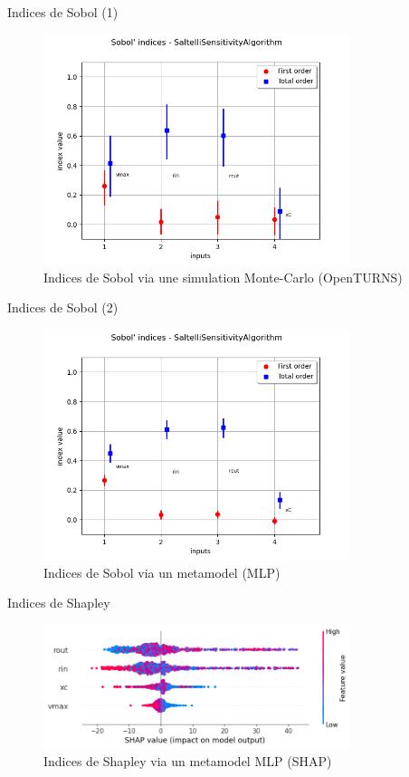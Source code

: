 \documentclass[10pt]{beamer}
\begin{document}
\begin{frame}{Indices de Sobol (1)}
  \begin{figure}
    \centering
    \includegraphics[width=0.8\textwidth]{images/sobol1.png}
    \caption{Indices de Sobol via une simulation Monte-Carlo (OpenTURNS\cite{baudinOpenTURNSIndustrialSoftware2016})}
  \end{figure}
\end{frame}

\begin{frame}{Indices de Sobol (2)}
  \begin{figure}
    \centering
    \includegraphics[width=0.8\textwidth]{images/sobol2.png}
    \caption{Indices de Sobol via un metamodel (MLP)}
  \end{figure}
\end{frame}

\begin{frame}{Indices de Shapley}
  \begin{figure}
    \centering
    \includegraphics[width=0.8\textwidth]{images/shapley.png}
    \caption{Indices de Shapley via un metamodel MLP (SHAP\cite{SHAP})}
  \end{figure}
\end{frame}
\end{document}
